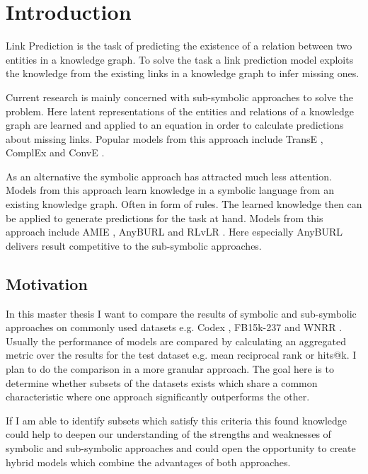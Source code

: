 \chapter{Introduction}
\label{cha:intro}
Link Prediction is the task of predicting the existence of a relation between two entities in a knowledge graph. To solve the task a link prediction model exploits the knowledge from the existing links in a knowledge graph to infer missing ones. 

Current research is mainly concerned with sub-symbolic approaches to solve the problem. Here latent representations of the entities and relations of a knowledge graph are learned and applied to an equation in order to calculate predictions about missing links. Popular models from this approach include TransE \cite{bordes_translating_2013}, ComplEx \cite{trouillon_complex_2016} and ConvE \cite{dettmers_convolutional_2018}.   

As an alternative the symbolic approach has attracted much less attention. \cite{wang_knowledge_2017} Models from this approach learn knowledge in a symbolic language from an existing knowledge graph. Often in form of rules. The learned knowledge then can be applied to generate predictions for the task at hand. Models from this approach include AMIE \cite{galarraga_amie_2013}, AnyBURL \cite{meilicke_anytime_2019} and RLvLR \cite{ghiasnezhad_omran_scalable_2018}. Here especially AnyBURL delivers result competitive to the sub-symbolic approaches. 

\section{Motivation}
In this master thesis I want to compare the results of symbolic and sub-symbolic approaches on commonly used datasets e.g. Codex \cite{safavi_codex_2020}, FB15k-237 \cite{toutanova_observed_2015} and WNRR \cite{dettmers_convolutional_2018}. Usually the performance of models are compared by calculating an aggregated metric over the results for the test dataset e.g. mean reciprocal rank or hits@k. I plan to do the comparison in a more granular approach. The goal here is to determine whether subsets of the datasets exists which share a common characteristic where one approach significantly outperforms the other. 

If I am able to identify subsets which satisfy this criteria this found knowledge could help to deepen our understanding of the strengths and weaknesses of symbolic and sub-symbolic approaches and could open the opportunity  to create hybrid models which combine the advantages of both approaches.


